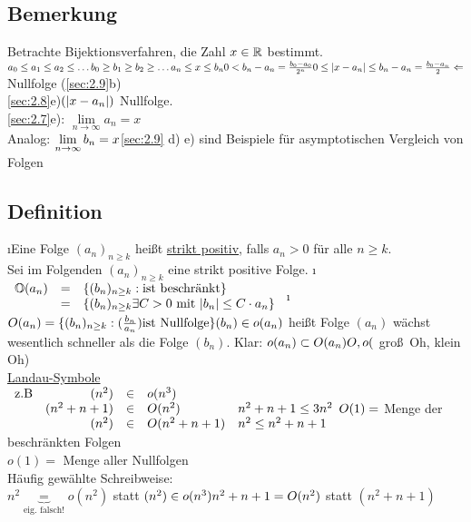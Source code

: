 \subsection{Bemerkung}
Betrachte Bijektionsverfahren, die Zahl $x \in \mathbb{R}$ bestimmt.\\
$a_0 \leq a_1 \leq a_2 \leq \ldots\\
b_0 \geq b_1 \geq b_2 \geq \ldots\\
a_n \leq x \leq b_n\\
0 < b_n - a_n = \frac{b_0 - a_0}{2^n}\\
0 \leq \lvert x-a_n \rvert \leq b_n - a_n = \frac{b_0-a_n}{2} \Leftarrow$ Nullfolge (\ref{sec:2.9}b)\\
\ref{sec:2.8}e)$ (\lvert x-a_n \rvert)$ Nullfolge.\\
\ref{sec:2.7}e): $\lim\limits_{n \rightarrow \infty} a_n = x$\\
Analog: $\lim\limits_{n \rightarrow \infty} b_n = x\\
$\ref{sec:2.9} d) e) sind Beispiele für asymptotischen Vergleich von Folgen
\subsection{Definition}
\begin{enumerate}[a)]
\i Eine Folge $(a_n)_{ n \geq k}$ hei\ss t \underline{strikt positiv}, falls $a_n > 0$ für alle $n \geq k$.\\
Sei im Folgenden $(a_n)_{n \geq k}$ eine strikt positive Folge.
\i $\begin{array}{rcl}
\mathbb{O}(a_n) &=& \{ (b_n)_{n \geq k} : \text{ist beschränkt} \}\\
&=& \{ (b_n)_{n \geq k} \exists C > 0 \text{ mit } \lvert b_n \rvert \leq C \cdot a_n \}
\end{array}$
\i $O(a_n) = \{(b_n)_{n \geq k}: (\frac{b_n}{a_n}) \text{ist Nullfolge} \}\\
(b_n) \in o(a_n)$ hei\ss t Folge $(a_n)$ wächst wesentlich schneller als die Folge $(b_n)$.
Klar: $o(a_n) \subset O(a_n)\\
O,o ($ \glqq gro\ss \ Oh\grqq, \glqq klein Oh\grqq)\\
\underline{Landau-Symbole}\\
$\begin{array}{lrrll}
\text{z.B}& (n^2) &\in& o(n^3)\\
& (n^2+n+1) &\in& O(n^2) & n^2 + n + 1 \leq 3n^2\\
& (n^2) &\in&O(n^2 + n +1) &n^2 \leq n^2 + n + 1
\end{array}\\
O(1) =$ Menge der beschränkten Folgen\\
$o(1)=$ Menge aller Nullfolgen\\
Häufig gewählte Schreibweise:\\
$n^2 \underbrace{=}_{\text{eig. falsch!}} o(n^2)$ statt $(n^2) \in o(n^3)\\
n^2+n+1 =O(n^2)$ statt $(n^2+n+1)$
\end{enumerate}
